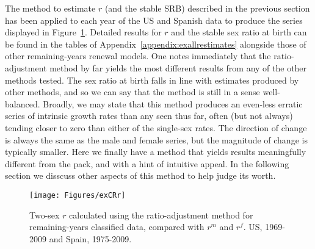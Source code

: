 \FloatBarrier

The method to estimate $r$ (and the stable SRB) described in the previous
section has been applied to each year of the US and Spanish data to produce the
series displayed in Figure~\ref{fig:exCRr}. Detailed results for $r$ and the
stable sex ratio at birth can be found in the tables of Appendix~\ref{appendix:exallrestimates} 
alongside those of other remaining-years renewal models. One notes immediately
that the ratio-adjustment method by far yields the most different results from
any of the other methods tested. The sex ratio at birth falls in line with estimates
produced by other methods, and so we can say that the method is still in a sense
well-balanced. Broadly, we may state that this method produces an even-less
erratic series of intrinsic growth rates than any seen thus far, often
(but not always) tending closer to zero than either of the single-sex rates. The
direction of change is always the same as the male and female series, but the
magnitude of change is typically smaller. Here we finally have a method that
yields results meaningfully different from the pack, and with a hint of
intuitive appeal. In the following section we disscuss other aspects of this
method to help judge its worth.

\begin{figure}[ht!]
        \centering  
          \caption{Two-sex $r$ calculated using the ratio-adjustment method for
          remaining-years classified data, compared with $r^m$ and $r^f$. US, 1969-2009 and
          Spain, 1975-2009.}
           \texttt{[image: Figures/exCRr]}
          \label{fig:exCRr}
\end{figure}

\FloatBarrier
